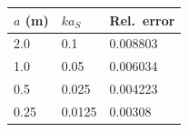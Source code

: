 \begin{tabular}{lll}
\toprule
$a$ (m) & $ka_S$ & Rel.\ error \\
\midrule
2.0 & 0.1 & 0.008803 \\
1.0 & 0.05 & 0.006034 \\
0.5 & 0.025 & 0.004223 \\
0.25 & 0.0125 & 0.00308 \\
\bottomrule
\end{tabular}
